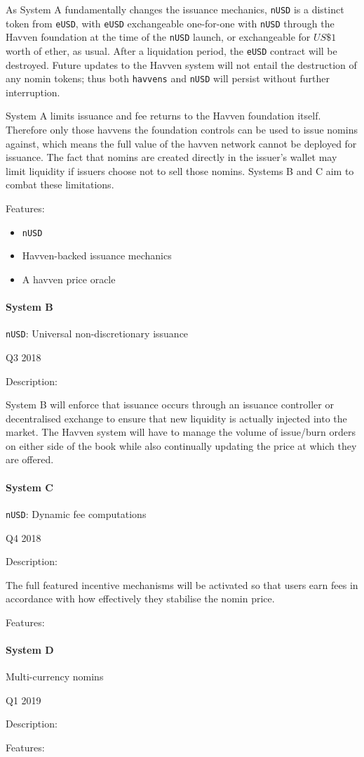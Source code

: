 As System A fundamentally changes the issuance mechanics, \texttt{nUSD} is a distinct
token from \texttt{eUSD}, with \texttt{eUSD} exchangeable one-for-one with \texttt{nUSD}
through the Havven foundation at the time of the \texttt{nUSD} launch, or exchangeable
for \(US\$1\) worth of ether, as usual. After a liquidation period, the \texttt{eUSD} contract
will be destroyed.
Future updates to the Havven system will not entail the destruction of any nomin tokens; thus
both \texttt{havvens} and \texttt{nUSD} will persist without further interruption.

System A limits issuance and fee returns to the Havven foundation itself. Therefore
only those havvens the foundation controls can be used to issue nomins against, which means
the full value of the havven network cannot be deployed for issuance. The fact that nomins
are created directly in the issuer's wallet may limit liquidity if issuers choose not to sell
those nomins. Systems B and C aim to combat these limitations.

Features:
\begin{itemize}
    \item{\texttt{nUSD}}
    \item{Havven-backed issuance mechanics}
    \item{A havven price oracle}
\end{itemize}


\paragraph{System B} \texttt{nUSD}: Universal non-discretionary issuance

Q3 2018

Description:

System B will enforce that issuance occurs through an issuance controller or
decentralised exchange to ensure that new liquidity is actually injected
into the market. The Havven system will have to manage the volume of
issue/burn orders on either side of the book while also continually updating
the price at which they are offered.


\paragraph{System C} \texttt{nUSD}: Dynamic fee computations

Q4 2018

Description:

The full featured incentive mechanisms will be activated so that users earn fees
in accordance with how effectively they stabilise the nomin price.

Features:


\paragraph{System D} Multi-currency nomins

Q1 2019

Description:

Features:
